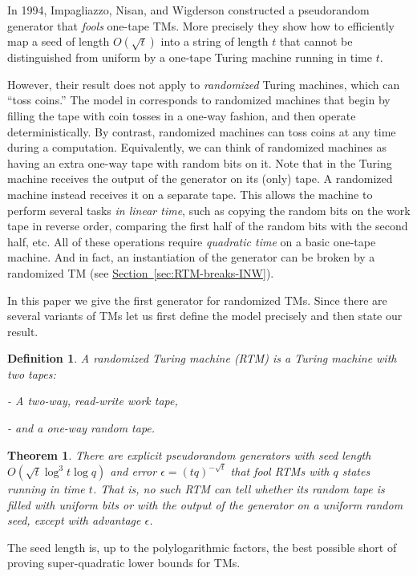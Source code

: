 \documentclass[11pt]{article}
\numberwithin{equation}{section}
\theoremstyle{definition}
\theoremstyle{plain}
\newcommand{\expref}[2]{\hyperref[#2]{#1~\ref{#2}}}
\newtheorem{thm}[theorem]{Theorem}
\newtheorem{defn}[theorem]{Definition}
\newcommand{\eps}{\epsilon}
\begin{document}
In 1994, Impagliazzo, Nisan, and Wigderson constructed a pseudorandom
generator \cite{INW94} that \emph{fools }one-tape TMs. More precisely
they show how to efficiently map a seed of length $O(\sqrt{t})$ into
a string of length $t$ that cannot be distinguished from uniform
by a one-tape Turing machine running in time $t$.

However,   %
their result does not apply to \emph{randomized} Turing machines,
%
which %
can ``toss coins.'' 
The model in \cite{INW94} corresponds
to randomized machines that begin by filling the tape with coin tosses
in a one-way fashion, and then operate deterministically. By contrast,
randomized machines can toss coins at any time during a computation.
Equivalently, we can think of randomized machines as having an extra
one-way tape with random bits on it. Note that in \cite{INW94} the
Turing machine receives the output of the generator on its (only)
tape. A randomized machine instead receives it on a separate tape.
This allows the machine to perform several tasks \emph{in linear time},
such as copying the random bits on the work tape in reverse order,
comparing the first half of the random bits with the second half,
etc. All of these operations require \emph{quadratic time} on a basic
one-tape machine. And in fact, an instantiation of the \cite{INW94}
generator can be broken by a randomized TM  %
(see \expref{Section}{sec:RTM-breaks-INW}).

In this paper we give the first generator for randomized TMs. Since
there are several variants of TMs let us first define the model precisely
and then state our result.
\begin{defn}
A randomized Turing machine (RTM) is a Turing machine with two tapes:

- A two-way, read-write work tape,

- and a one-way random tape.
\end{defn}

\begin{thm}
\label{thm:prg} There are explicit pseudorandom generators with seed
length $O(\sqrt{t}\log^{3}t\log q)$ and error $\eps=(tq)^{-\sqrt{t}}$
that fool RTMs with $q$ states running in time $t$. That is, no
such RTM can tell whether its random tape is filled with uniform bits
or with the output of the generator on a uniform
random  %
seed, except with advantage $\eps$.
\end{thm}

%

The seed length is, up to the polylogarithmic factors, the best possible
short of proving super-quadratic lower bounds for TMs.
\end{document}
